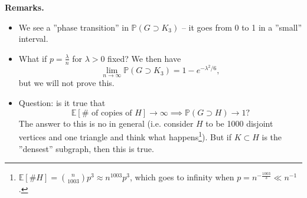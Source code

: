 \documentclass{article}
\theoremstyle{definition}
\begin{document}
\textbf{Remarks.} 
\begin{itemize}
    \item We see a ''phase transition'' in $\mathbb{P}(G \supset K_3)$ -- it goes from 0 to 1 in a ''small'' interval.
    \item What if $p = \frac{\lambda}{n}$ for $\lambda>0$ fixed? We then have \[
    \lim_{n \to \infty} \mathbb{P}(G \supset K_3) = 1 - e^{-\lambda^2/6},
    \]
    but we will not prove this.
    \item Question: is it true that \[
        \mathbb{E}[\# \text{ of copies of }H] \to \infty \implies \mathbb{P}(G \supset H) \to 1?
    \]
    The answer to this is no in general (i.e. consider $H$ to be 1000 disjoint vertices and one triangle and think what happens\footnote{$\mathbb{E}[\# H] = {n\choose{1003}}p^3 \approx n^{1003}p^3$, which goes to infinity when $p = n^{-\frac{1003}{3}} \ll n^{-1}$.}). But if $K \subset H$ is the ''densest'' subgraph, then this is true.
\end{itemize}

\end{document}
